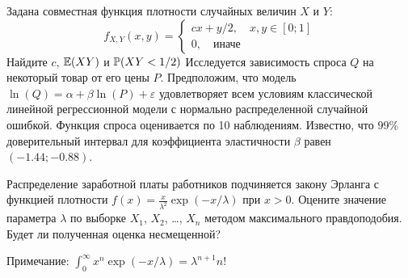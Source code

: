 \documentclass[addpoints, answers]{exam} %
\begin{document}
\begin{questions}
\question Задана совместная функция плотности случайных величин $X$ и $Y$:
\[
f_{X,Y}(x,y)=\left\{\begin{array}{c}
cx+y/2,\quad x,y\in [0;1] \\ 
0,\quad \text{иначе}
\end{array}  \right.
\]
Найдите $c$, $\E(XY)$ и $\P(XY<1/2)$
\question Исследуется зависимость спроса $Q$ на некоторый товар от его цены $P$. Предположим, что модель $\ln(Q)=\alpha+\beta\ln(P)+\varepsilon$ удовлетворяет всем условиям классической линейной регрессионной модели с нормально распределенной случайной ошибкой. Функция спроса оценивается по 10 наблюдениям. Известно, что 99\% доверительный интервал для коэффициента эластичности $\beta$ равен $(-1.44;-0.88)$.
\question Распределение заработной платы работников подчиняется закону Эрланга с функцией плотности $f(x)=\frac{x}{\lambda^2}\exp(-x/\lambda)$ при $x>0$. Оцените значение параметра $\lambda$ по выборке $X_1$, $X_2$, \ldots, $X_n$ методом максимального правдоподобия. Будет ли полученная оценка несмещенной?

Примечание: $\int_0^{\infty} x^n \exp(-x/\lambda)=\lambda^{n+1}n!$
\end{questions}
\end{document}
